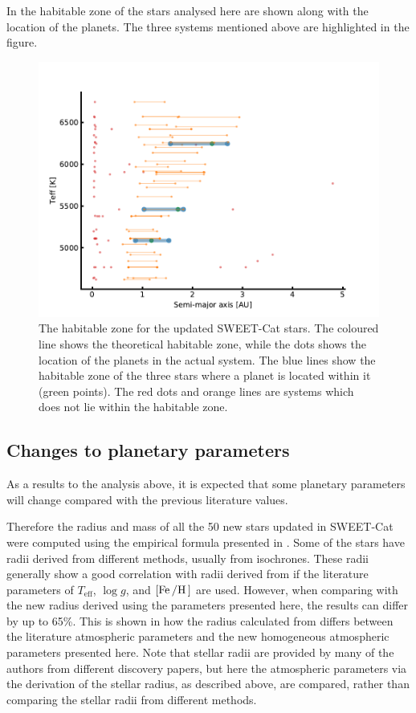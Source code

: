 In  the habitable zone of the stars analysed here are shown along with the location of
the planets. The three systems mentioned above are highlighted in the figure.

\begin{figure}[htpb!]
    \centering
    \includegraphics[width=0.8\linewidth]{figures/HZ.pdf}
    \caption{The habitable zone for the updated SWEET-Cat stars. The coloured line shows the
             theoretical habitable zone, while the dots shows the location of the planets in the
             actual system. The blue lines show the habitable zone of the three stars where a planet
             is located within it (green points). The red dots and orange lines are systems which
             does not lie within the habitable zone.}
    \label{fig:HZ}
\end{figure}



\subsection{Changes to planetary parameters}

As a results to the analysis above, it is expected that some planetary parameters will change
compared with the previous literature values.

Therefore the radius and mass of all the 50 new stars updated in SWEET-Cat were computed using the
empirical formula presented in \citet{Torres2010}. Some of the stars have radii derived from
different methods, usually from isochrones. These radii generally show a good correlation with radii
derived from \citet{Torres2010} if the literature parameters of $T_\mathrm{eff}$, $\log g$, and
$[\ion{Fe}/\ion{H}]$ are used. However, when comparing with the new radius derived using the
parameters presented here, the results can differ by up to 65\%. This is shown in  how
the radius calculated from \citet{Torres2010} differs between the literature atmospheric parameters
and the new homogeneous atmospheric parameters presented here. Note that stellar radii are provided
by many of the authors from different discovery papers, but here the atmospheric parameters via the
derivation of the stellar radius, as described above, are compared, rather than comparing the
stellar radii from different methods.

